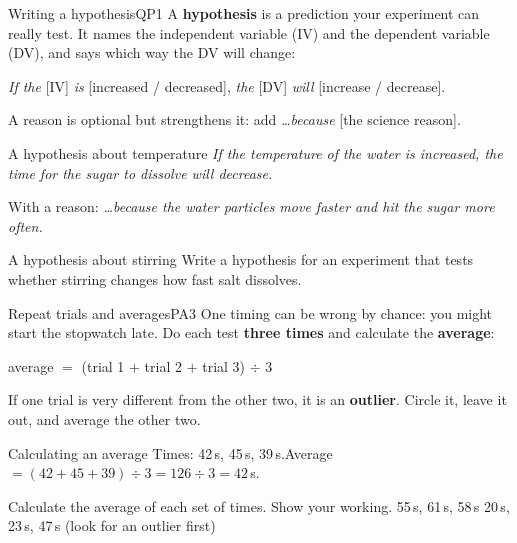 
\begin{technique}{Writing a hypothesis}{QP1}
A \textbf{hypothesis} is a prediction your experiment can really test. It names the independent variable (IV) and the dependent variable (DV), and says which way the DV will change:
\begin{center}\emph{If the} [IV] \emph{is} [increased / decreased], \emph{the} [DV] \emph{will} [increase / decrease].\end{center}
A reason is optional but strengthens it: add \emph{\dots because} [the science reason].
\end{technique}

\begin{workedex}{A hypothesis about temperature}
\emph{If the temperature of the water is increased, the time for the sugar to dissolve will decrease.}

\smallskip
With a reason: \emph{\dots because the water particles move faster and hit the sugar more often.}
\end{workedex}

\begin{wedo}{A hypothesis about stirring}
Write a hypothesis for an experiment that tests whether stirring changes how fast salt dissolves.
\answerbox{3.5cm}
\end{wedo}

\begin{technique}{Repeat trials and averages}{PA3}
One timing can be wrong by chance: you might start the stopwatch late. Do each test \textbf{three times} and calculate the \textbf{average}:
\begin{center}average $=$ (trial 1 $+$ trial 2 $+$ trial 3) $\div$ 3\end{center}
If one trial is very different from the other two, it is an \textbf{outlier}. Circle it, leave it out, and average the other two.
\end{technique}

\begin{workedex}{Calculating an average}
Times: 42\,s, 45\,s, 39\,s.\qquad Average $= (42 + 45 + 39) \div 3 = 126 \div 3 = 42$\,s.
\end{workedex}

\begin{youdobox}[Averages]
\task Calculate the average of each set of times. Show your working. 
55\,s, 61\,s, 58\,s
\workbox{2cm}
20\,s, 23\,s, 47\,s (look for an outlier first)
\workbox{2.5cm}
\end{youdobox}


